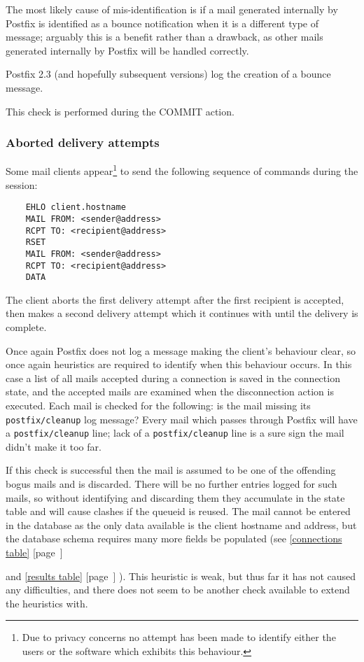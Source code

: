 \documentclass[a4paper,12pt,draft]{article}
\newcommand{\refwithpage}[1]{%
    \empty{}\ref{#1} [page~\pageref{#1}]%
}
\newcommand{\sectionref}[1]{%
    \textsection{}\refwithpage{#1}%
}
\newcommand{\daemon}[1]{%
    \texttt{postfix/#1}%
}
\begin{document}
The most likely cause of mis-identification is if a mail generated
internally by Postfix is identified as a bounce notification when it is a
different type of message; arguably this is a benefit rather than a
drawback, as other mails generated internally by Postfix will be handled
correctly.

Postfix 2.3 (and hopefully subsequent versions) log the creation of a
bounce message.

This check is performed during the COMMIT action.

\subsubsection{Aborted delivery attempts}

\label{aborted-delivery-attempts}

Some mail clients appear\footnote{Due to privacy concerns no attempt has
been made to identify either the users or the software which exhibits this
behaviour.} to send the following sequence of commands during
the \SMTP{} session:

\begin{verbatim}
    EHLO client.hostname
    MAIL FROM: <sender@address>
    RCPT TO: <recipient@address>
    RSET
    MAIL FROM: <sender@address>
    RCPT TO: <recipient@address>
    DATA
\end{verbatim}

The client aborts the first delivery attempt after the first recipient is
accepted, then makes a second delivery attempt which it continues with
until the delivery is complete.

Once again Postfix does not log a message making the client's behaviour
clear, so once again heuristics are required to identify when this
behaviour occurs.  In this case a list of all mails accepted during a
connection is saved in the connection state, and the accepted mails are
examined when the disconnection action is executed.  Each mail is checked
for the following: is the mail missing its \daemon{cleanup} log message?
Every mail which passes through Postfix will have a \daemon{cleanup} line;
lack of a \daemon{cleanup} line is a sure sign the mail didn't make it too
far.

If this check is successful then the mail is assumed to be one of the
offending bogus mails and is discarded.  There will be no further entries
logged for such mails, so without identifying and discarding them they
accumulate in the state table and will cause clashes if the queueid is
reused.  The mail cannot be entered in the database as the only data
available is the client hostname and \IP{} address, but the database schema
requires many more fields be populated (see \sectionref{connections table}
and \sectionref{results table}).  This heuristic is weak, but thus far it
has not caused any difficulties, and there does not seem to be another
check available to extend the heuristics with.
\end{document}

